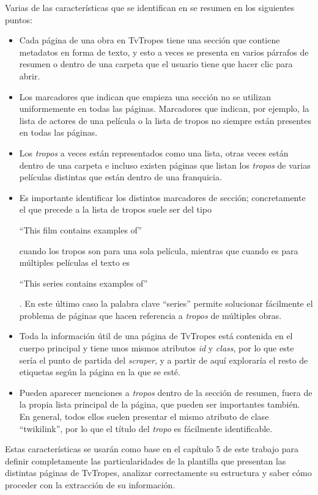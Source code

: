 Varias de las características que se identifican en \cite{nishalscraping} se
resumen en los siguientes puntos:
\begin{itemize}
    \item Cada página de una obra en TvTropes tiene una sección que contiene
    metadatos en forma de texto, y esto a veces se presenta en varios párrafos
    de resumen o dentro de una carpeta que el usuario tiene que hacer clic para
    abrir. 
    \item Los marcadores que indican que empieza una sección no se utilizan
    uniformemente en todas las páginas. Marcadores que indican, por ejemplo, la
    lista de actores de una película o la lista de tropos no siempre están
    presentes en todas las páginas.
    \item Los \textit{tropos} a veces están representados como una lista, otras
    veces están dentro de una carpeta e incluso existen páginas que listan los
    \textit{tropos} de varias películas distintas que están dentro de una
    franquicia.
    \item Es importante identificar los distintos marcadores de sección;
    concretamente el que precede a la lista de tropos suele ser del tipo
    \begin{otherlanguage}{english} ``This film contains examples of''
    \end{otherlanguage} cuando los tropos son para una sola película, mientras
    que cuando es para múltiples películas el texto es
    \begin{otherlanguage}{english} ``This series contains examples
    of''\end{otherlanguage}. En este último caso la palabra clave ``series''
    permite solucionar fácilmente el problema de páginas que hacen referencia a
    \textit{tropos} de múltiples obras.
    \item Toda la información útil de una página de TvTropes está contenida en
    el cuerpo principal y tiene unos mismos atributos \textit{id} y
    \textit{class}, por lo que este sería el punto de partida del
    \textit{scraper}, y a partir de aquí exploraría el resto de etiquetas según
    la página en la que se esté.
    \item Pueden aparecer menciones a \textit{tropos} dentro de la sección de
    resumen, fuera de la propia lista principal de la página, que pueden ser
    importantes también. En general, todos ellos suelen presentar el mismo
    atributo de clase ``twikilink'', por lo que el título del \textit{tropo} es
    fácilmente identificable.
\end{itemize}

Estas características se usarán como base en el capítulo 5 de este trabajo para
definir completamente las particularidades de la plantilla que presentan las
distintas páginas de TvTropes, analizar correctamente su estructura y saber cómo
proceder con la extracción de su información.
